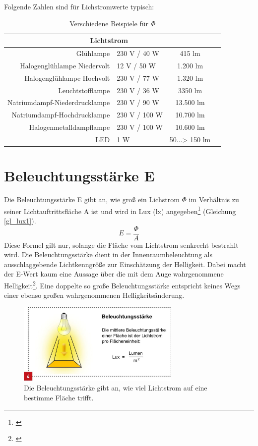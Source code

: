 Folgende Zahlen sind für Lichstromwerte typisch:
\newpage
\begin{table}[htp] 
		\centering
		\begin{tabular}{rlcc}  %
		\toprule
		\multicolumn{3}{c}{\large\sffamily Lichtstrom}\\ 							
		\midrule
		Glühlampe & 230 V / 40 W & 415 lm\\ 
		Halogenglühlampe Niedervolt & 12 V / 50 W & 1.200 lm\\
		Halogenglühlampe Hochvolt & 230 V / 77 W & 1.320 lm\\
		Leuchtstofflampe & 230 V / 36 W & 3350 lm\\
		Natriumdampf-Niederdrucklampe & 230 V / 90 W & 13.500 lm\\
		Natriumdampf-Hochdrucklampe & 230 V / 100 W & 10.700 lm\\
		Halogenmetalldampflampe & 230 V / 100 W & 10.600 lm\\
		LED & 1 W & 50...> 150 lm\\
		\bottomrule
		\end{tabular}
		\caption{Verschiedene Beispiele für $\Phi$\protect\footnotemark}	
		\label{t_lumen}
	\end{table}


\section{Beleuchtungsstärke E}\label{sec_lux}
Die Beleuchtungsstärke E gibt an, wie groß ein Lichstrom $\Phi$ im Verhältnis zu seiner Lichtauftrittsfläche A ist  und wird in Lux (lx) angegeben\footnote{\cite[28]{ris}} (Gleichung \ref{gl_lux1}).
 \begin{equation}\label{gl_lux1}
	E=\frac{\Phi}{A}	
\end{equation}
Diese Formel gilt nur, solange die Fläche vom Lichtstrom senkrecht bestrahlt wird. Die Beleuchtungsstärke dient in der Innenraumbeleuchtung als ausschlaggebende Lichtkenngröße zur Einschätzung der Helligkeit. Dabei macht der E-Wert kaum eine Aussage über die mit dem Auge wahrgenommene Helligkeit\footnote{\cite[29]{ris}}. Eine doppelte so große Beleuchtungsstärke entspricht keines Wegs einer ebenso großen wahrgenommenen Helligkeitsänderung.

\begin{figure}[H]     %
\centering
\includegraphics[width=0.7\textwidth]{bilder/lux} 
\caption {Die Beleuchtungsstärke gibt an, wie viel Lichtstrom auf eine bestimme Fläche trifft.\protect\footnotemark}\label{b_lux}
\end{figure}


